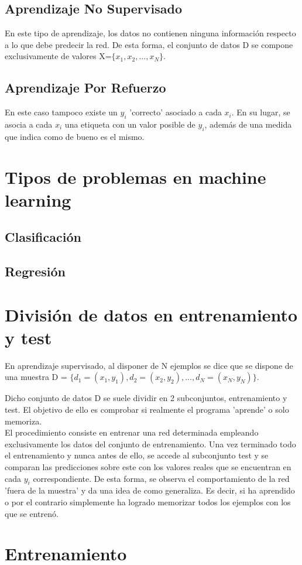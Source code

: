 \subsection{Aprendizaje No Supervisado}

En este tipo de aprendizaje, los datos no contienen ninguna información respecto a lo que debe predecir la red. De esta forma, el conjunto de datos D se compone exclusivamente de valores X=$\{x_1, x_2, ..., x_N\}$. \cite{Learning_From_Data}

\subsection{Aprendizaje Por Refuerzo}

En este caso tampoco existe un $y_i$ 'correcto' asociado a cada $x_i$. En su lugar, se asocia a cada $x_i$ una etiqueta con un valor posible de $y_i$, además de una medida que indica como de bueno es el mismo. \cite{Learning_From_Data}

\section{Tipos de problemas en machine learning}

\subsection{Clasificación}

\subsection{Regresión}

\section{División de datos en entrenamiento y test}

En aprendizaje supervisado, al disponer de N ejemplos se dice que se dispone de una muestra D = $\{d_1 = (x_1, y_1), d_2 = (x_2, y_2), ..., d_N = (x_N, y_N)\}$.

Dicho conjunto de datos D se suele dividir en 2 subconjuntos, entrenamiento y test. El objetivo de ello es comprobar si realmente el programa 'aprende' o solo memoriza.\\
El procedimiento consiste en entrenar una red determinada empleando exclusivamente los datos del conjunto de entrenamiento. Una vez terminado todo el entrenamiento y nunca antes de ello, se accede al subconjunto test y se comparan las predicciones sobre este con los valores reales que se encuentran en cada $y_i$ correspondiente. De esta forma, se observa el comportamiento de la red 'fuera de la muestra' y da una idea de como generaliza. Es decir, si ha aprendido o por el contrario simplemente ha logrado memorizar todos los ejemplos con los que se entrenó.

\section{Entrenamiento}

